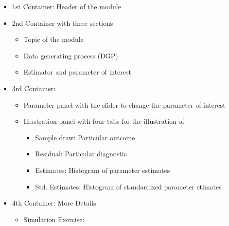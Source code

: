 \documentclass[12pt]{article}
\begin{document}
\begin{itemize}
	\item 1st Container: Header of the module
	\item 2nd Container with three sections
	\begin{itemize}
		\item Topic of the module
		\item Data generating process (DGP)
		\item Estimator and parameter of interest
	\end{itemize}
	\item 3rd Container:
	\begin{itemize}
		\item Parameter panel with the slider to change the parameter of interest
		\item Illustration panel with four tabs for the illustration of
		\begin{itemize}
			\item Sample draw: Particular outcome
			\item Residual: Particular diagnostic
			\item Estimates: Histogram of parameter estimates
			\item Std. Estimates: Histogram of standardized parameter etimates
		\end{itemize}
	\end{itemize}
	\item 4th Container: More Details
	\begin{itemize}
		\item Simulation Exercise: 
	\end{itemize}
	
\end{itemize}





	
\end{document}
